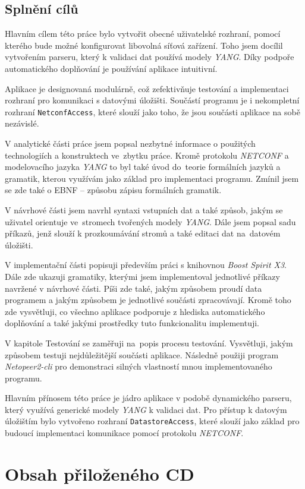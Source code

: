 \documentclass[thesis=B,czech,hidelinks]{FITthesis}[2019/03/06]
\begin{document}
\section{Splnění cílů}
Hlavním cílem této práce bylo vytvořit obecné uživatelské rozhraní, pomocí kterého bude možné konfigurovat libovolná síťová zařízení. Toho jsem docílil vytvořením parseru, který k validaci dat používá modely \textit{YANG}. Díky podpoře automatického doplňování je používání aplikace intuitivní.

Aplikace je designovaná modulárně, což zefektivňuje testování a implementaci rozhraní pro komunikaci s datovými úložišti. Součástí programu je i nekompletní rozhraní \texttt{NetconfAccess}, které slouží jako  toho, že jsou součásti aplikace na sobě nezávislé.


\begin{conclusion}
V analytické části práce jsem popsal nezbytné informace o použitých technologiích a konstruktech ve~zbytku práce. Kromě protokolu \textit{NETCONF} a modelovacího jazyka \textit{YANG} to byl také úvod do~teorie formálních jazyků a gramatik, kterou využívám jako základ pro implementaci programu. Zmínil jsem se zde také o EBNF -- způsobu zápisu formálních gramatik.

V návrhové části jsem navrhl syntaxi vstupních dat a také způsob, jakým se uživatel orientuje ve~stromech tvořených modely \textit{YANG}. Dále jsem popsal sadu příkazů, jenž slouží k prozkoumávání stromů a také editaci dat na~datovém úložišti.

V implementační části popisuji především práci s knihovnou \textit{Boost Spirit X3}. Dále zde ukazuji gramatiky, kterými jsem implementoval jednotlivé příkazy navržené v návrhové části. Píši zde také, jakým způsobem proudí data programem a jakým způsobem je jednotlivé součásti zpracovávají. Kromě toho zde vysvětluji, co všechno aplikace podporuje z hlediska automatického doplňování a také jakými prostředky tuto funkcionalitu implementuji.

V kapitole Testování se zaměřuji na~popis procesu testování. Vysvětluji, jakým způsobem testuji nejdůležitější součásti aplikace. Následně použiji program \textit{Netopeer2-cli} pro demonstraci silných vlastností mnou implementovaného programu.

Hlavním přínosem této práce je jádro aplikace v podobě dynamického parseru, který využívá generické modely \textit{YANG} k validaci dat. Pro přístup k datovým úložištím bylo vytvořeno rozhraní \texttt{DatastoreAccess}, které slouží jako základ pro budoucí implementaci komunikace pomocí protokolu \textit{NETCONF}.
\end{conclusion}

\printbibliography{}

\appendix

\chapter{Obsah přiloženého CD}

\end{document}

